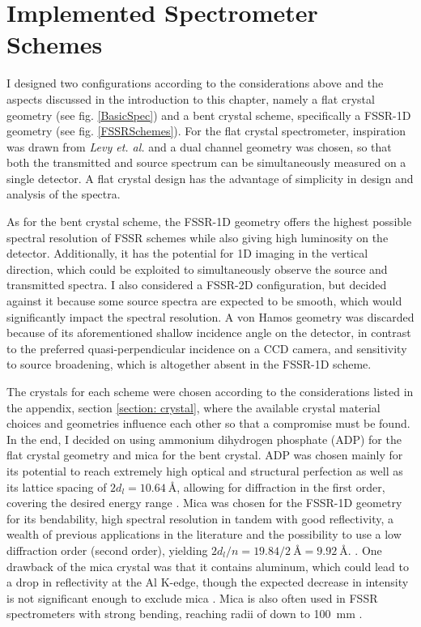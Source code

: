\section{Implemented Spectrometer Schemes}
\label{section: spectrometer geometries}
I designed two configurations according to the 
considerations above and the aspects discussed in the introduction to 
this chapter, namely a flat 
crystal geometry (see fig. \ref{BasicSpec}) 
and 
a bent crystal scheme, specifically a FSSR-1D geometry (see 
fig. \ref{FSSRSchemes}). For the flat crystal 
spectrometer, inspiration was 
drawn from \textit{Levy et. al.} \citep{levy2010double} and a dual channel 
geometry was chosen, so 
that both the transmitted and source spectrum can be 
simultaneously measured on a single detector. A flat crystal design has 
the advantage of simplicity in design and analysis of the spectra.

As for the bent crystal scheme, the 
FSSR-1D geometry offers the highest possible spectral 
resolution of FSSR schemes while also giving 
high luminosity on the detector. Additionally, it has the 
potential for 
1D imaging in the 
vertical direction, which could be exploited to 
simultaneously observe the 
source and transmitted spectra. I also considered a 
FSSR-2D configuration, but 
decided against it because some source spectra are 
expected to be smooth, 
which would significantly impact the spectral 
resolution. A von Hamos geometry was discarded because of its 
aforementioned shallow incidence angle on 
the detector, in contrast to the preferred quasi-perpendicular incidence on a CCD camera, and sensitivity to source 
broadening, 
which is altogether absent in the FSSR-1D scheme. 

The crystals for each scheme were chosen according to the considerations 
listed in the appendix, section \ref{section: crystal}, where the available crystal material choices and geometries influence each other so that a compromise must be found. In the end, I 
decided on using
ammonium dihydrogen phosphate (ADP) for the flat crystal geometry and 
mica for the bent crystal. ADP was 
chosen mainly for
its potential to reach 
extremely high optical and structural perfection as well 
as its lattice spacing of $2d_l = 
\SI{10.64}{\angstrom}$, allowing for diffraction in 
the first order, covering the 
desired energy range 
\citep{ferrari2019characterization, 
rajesh2015growth}. Mica was chosen for the FSSR-1D geometry for 
its bendability, high spectral 
resolution in tandem 
with good 
reflectivity, a wealth of previous applications in the 
literature and the possibility to use a low 
diffraction order (second order), yielding $2d_l/n = 
19.84/\SI{2}{\angstrom} = 
\SI{9.92}{\angstrom}$.
\citep{monot2002high,renner2019challenges,faenov1994,blasco2001portable}.
 One 
drawback of the mica crystal was that it contains 
aluminum, which could lead to 
a drop in reflectivity at the Al K-edge, though the 
expected decrease in 
intensity is not significant enough to exclude mica 
\citep{alkhimova2016determination}. Mica is also often 
used in FSSR 
spectrometers with strong bending, reaching radii of 
down to 
\SI{100}{\milli\meter} \citep{monot2002high}.

